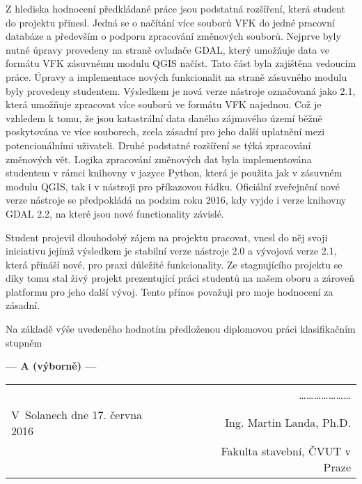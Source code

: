 \documentclass[czech,11pt,a4paper]{article}
\begin{document}
Z hlediska hodnocení předkládané práce jsou podstatná rozšíření, která
student do projektu přinesl. Jedná se o načítání více souborů VFK do
jedné pracovní databáze a především o podporu zpracování změnových
souborů. Nejprve byly nutné úpravy provedeny na straně ovladače GDAL,
který umožňuje data ve formátu VFK zásuvnému modulu QGIS načíst. Tato
část byla zajištěna vedoucím práce. Úpravy a implementace nových
funkcionalit na straně zásuvného modulu byly provedeny
studentem. Výsledkem je nová verze nástroje označovaná jako 2.1,
která umožňuje zpracovat více souborů ve formátu VFK najednou. Což je
vzhledem k tomu, že jsou katastrální data daného zájmového území běžně
poskytována ve více souborech, zcela zásadní pro jeho další uplatnění
mezi potencionálními uživateli. Druhé podstatné rozšíření se týká
zpracování změnových vět. Logika zpracování změnových dat byla
implementována studentem v rámci knihovny v jazyce
Python, která je použita jak v zásuvném modulu QGIS, tak i v nástroji
pro příkazovou řádku. Oficiální zveřejnění nové verze nástroje se
předpokládá na podzim roku 2016, kdy vyjde i verze knihovny GDAL 2.2,
na které jsou nové functionality závislé. \newpage

Student projevil dlouhodobý zájem na projektu pracovat, vnesl do něj
svoji iniciativu jejímž výsledkem je stabilní verze nástroje 2.0 a
vývojová verze 2.1, která přináší nové, pro praxi důležité
funkcionality. Ze stagnujícího projektu se díky tomu stal živý
projekt prezentující práci studentů na našem oboru a zároveň platformu
pro jeho další vývoj. Tento přínos považuji pro moje
hodnocení za zásadní. \newline

Na základě výše uvedeného hodnotím předloženou diplomovou práci
klasifikačním stupněm

\begin{center}
  {\bf --- A (výborně) --- }
\end{center}

\vskip 2cm

\begin{tabular}{lp{}r}
& & \ldots\ldots\ldots\ldots\ldots\ldots\ldots \\
V~Solanech dne 17. června 2016 & & Ing. Martin Landa, Ph.D. \\
& & Fakulta stavební, ČVUT v Praze \\
\end{tabular}
\end{document}
